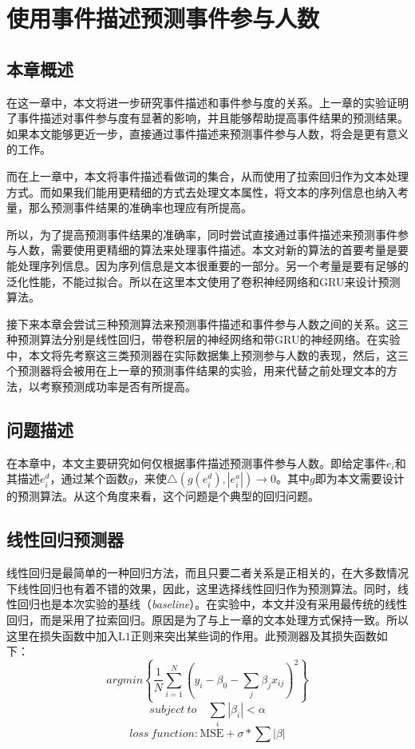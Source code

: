 % 
\section{使用事件描述预测事件参与人数}
\subsection{本章概述}
在这一章中，本文将进一步研究事件描述和事件参与度的关系。上一章的实验证明了事件描述对事件参与度有显著的影响，并且能够帮助提高事件结果的预测结果。如果本文能够更近一步，直接通过事件描述来预测事件参与人数，将会是更有意义的工作。

而在上一章中，本文将事件描述看做词的集合，从而使用了拉索回归作为文本处理方式。而如果我们能用更精细的方式去处理文本属性，将文本的序列信息也纳入考量，那么预测事件结果的准确率也理应有所提高。

所以，为了提高预测事件结果的准确率，同时尝试直接通过事件描述来预测事件参与人数，需要使用更精细的算法来处理事件描述。本文对新的算法的首要考量是要能处理序列信息。因为序列信息是文本很重要的一部分。另一个考量是要有足够的泛化性能，不能过拟合。所以在这里本文使用了卷积神经网络和GRU来设计预测算法。

接下来本章会尝试三种预测算法来预测事件描述和事件参与人数之间的关系。这三种预测算法分别是线性回归，带卷积层的神经网络和带GRU的神经网络。在实验中，本文将先考察这三类预测器在实际数据集上预测参与人数的表现，然后，这三个预测器将会被用在上一章的预测事件结果的实验，用来代替之前处理文本的方法，以考察预测成功率是否有所提高。

\subsection{问题描述}
在本章中，本文主要研究如何仅根据事件描述预测事件参与人数。即给定事件$e_i$和其描述$e_i^d$，通过某个函数$g$，来使$\bigtriangleup(g(e_i^d),|e_i^a|)\to 0$。其中$g$即为本文需要设计的预测算法。从这个角度来看，这个问题是个典型的回归问题。
\subsection{线性回归预测器}
线性回归是最简单的一种回归方法，而且只要二者关系是正相关的，在大多数情况下线性回归也有着不错的效果，因此，这里选择线性回归作为预测算法。同时，线性回归也是本次实验的基线（\textit{baseline}）。在实验中，本文并没有采用最传统的线性回归，而是采用了拉索回归。原因是为了与上一章的文本处理方式保持一致。所以这里在损失函数中加入$\mathrm{L1}$正则来突出某些词的作用。此预测器及其损失函数如下：
\begin{equation}
argmin\left\{\frac{1}{N}\displaystyle\sum_{i=1}^{N}
(y_i-\beta_0-\displaystyle\sum_{j}\beta_jx_{ij})^2\right\}
\end{equation}
\begin{equation}
subject\ to \quad \displaystyle\sum_{i}|\beta_i|<\alpha
\end{equation}
\begin{equation}
loss\ function: \mathrm{MSE}+\sigma*\sum|\beta|
\end{equation}

